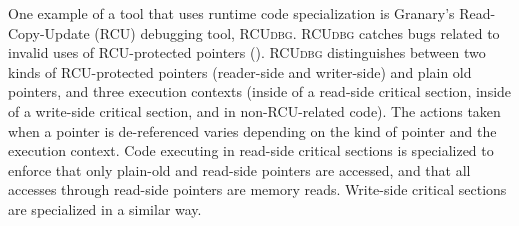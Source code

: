 \documentclass[preprint]{sigplanconf}
\newcommand{\toolname}[1]{{\scshape #1}}
\begin{document}
One example of a tool that uses runtime code specialization is Granary's Read-Copy-Update (RCU) debugging tool, \toolname{RCUdbg}. \toolname{RCUdbg} catches bugs related to invalid uses of RCU-protected pointers (). \toolname{RCUdbg} distinguishes between two kinds of RCU-protected pointers (reader-side and writer-side) and plain old pointers, and three execution contexts (inside of a read-side critical section, inside of a write-side critical section, and in non-RCU-related code). The actions taken when a pointer is de-referenced varies depending on the kind of pointer and the execution context. Code executing in read-side critical sections is specialized to enforce that only plain-old and read-side pointers are accessed, and that all accesses through read-side pointers are memory reads. Write-side critical sections are specialized in a similar way.
\end{document}
